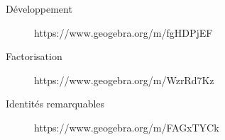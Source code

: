 \documentclass[openany]{book}
\begin{document}




\begin{seance}

\end{seance}






\begin{seance}

\end{seance}

\begin{description}
\item[Développement] https://www.geogebra.org/m/fgHDPjEF
\item[Factorisation] https://www.geogebra.org/m/WzrRd7Kz
\item[Identités remarquables] https://www.geogebra.org/m/FAGxTYCk
\end{description}


\begin{minipage}{0.49\linewidth}

\end{minipage}
\hfill
\begin{minipage}{0.49\linewidth}
\end{minipage}
\end{document}

